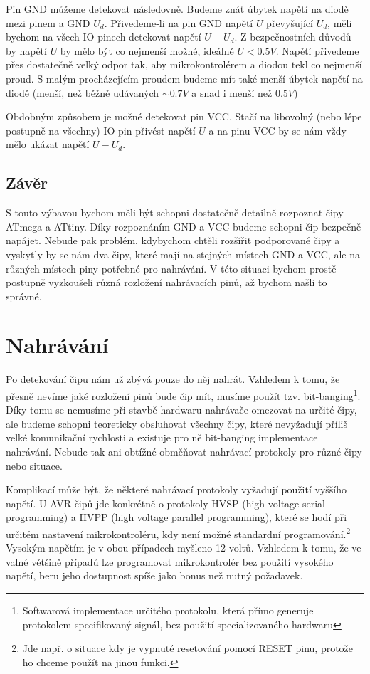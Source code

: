 \documentclass[11pt,a4paper,twoside,openright]{report}
\begin{document}
Pin GND můžeme detekovat následovně. Budeme znát úbytek napětí na diodě mezi pinem a GND $U_d$. Přivedeme-li na pin GND napětí $U$ převyšující $U_d$, měli bychom na všech IO pinech detekovat napětí $U-U_d$. Z bezpečnostních důvodů by napětí $U$ by mělo být co nejmenší možné, ideálně $U<0.5V$. Napětí přivedeme přes dostatečně velký odpor tak, aby mikrokontrolérem a diodou tekl co nejmenší proud. S malým procházejícím proudem budeme mít také menší úbytek napětí na diodě (menší, než běžně udávaných $\sim0.7V$ a snad i menší než $0.5V$)

Obdobným způsobem je možné detekovat pin VCC. Stačí na libovolný (nebo lépe postupně na všechny) IO pin přivést napětí $U$ a na pinu VCC by se nám vždy mělo ukázat napětí $U-U_d$.

\subsection {Závěr}

S touto výbavou bychom měli být schopni dostatečně detailně rozpoznat čipy ATmega a ATtiny. Díky rozpoznáním GND a VCC budeme schopni čip bezpečně napájet. Nebude pak problém, kdybychom chtěli rozšířit podporované čipy a vyskytly by se nám dva čipy, které mají na stejných místech GND a VCC, ale na různých místech piny potřebné pro nahrávání. V této situaci bychom prostě postupně vyzkoušeli různá rozložení nahrávacích pinů, až bychom našli to správné.

\section {Nahrávání}

Po detekování čipu nám už zbývá pouze do něj nahrát. Vzhledem k tomu, že přesně nevíme jaké rozložení pinů bude čip mít, musíme použít tzv. bit-banging\footnote{Softwarová implementace určitého protokolu, která přímo generuje protokolem specifikovaný signál, bez použití specializovaného hardwaru}. Díky tomu se nemusíme při stavbě hardwaru nahrávače omezovat na určité čipy, ale budeme schopni teoreticky obsluhovat všechny čipy, které nevyžadují příliš velké komunikační rychlosti a existuje pro ně bit-banging implementace nahrávání. Nebude tak ani obtížné obměňovat nahrávací protokoly pro různé čipy nebo situace.

Komplikací může být, že některé nahrávací protokoly vyžadují použití vyššího napětí. U AVR čipů jde konkrétně o protokoly HVSP (high voltage serial programming) a HVPP (high voltage parallel programming), které se hodí při určitém nastavení mikrokontroléru, kdy není možné standardní programování.\footnote{Jde např. o situace kdy je vypnuté resetování pomocí RESET pinu, protože ho chceme použít na jinou funkci.} Vysokým napětím je v obou případech myšleno 12 voltů.\cite{AVRprog} Vzhledem k tomu, že ve valné většině případů lze programovat mikrokontrolér bez použití vysokého napětí, beru jeho dostupnost spíše jako bonus než nutný požadavek.
\end{document}
